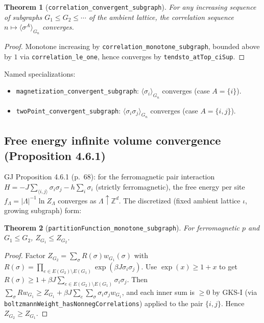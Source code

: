 \documentclass[a4paper,11pt]{article}
\newtheorem{theorem}{Theorem}
\begin{document}
\begin{theorem}[\texttt{correlation\_convergent\_subgraph}]
For any increasing sequence of subgraphs $G_1 \le G_2 \le \cdots$ of the ambient lattice,
the correlation sequence $n \mapsto \langle\sigma^A\rangle_{G_n}$ converges.
\end{theorem}

\begin{proof}
Monotone increasing by \texttt{correlation\_monotone\_subgraph},
bounded above by $1$ via \texttt{correlation\_le\_one}, hence converges by
\texttt{tendsto\_atTop\_ciSup}.
\end{proof}

Named specializations:
\begin{itemize}
  \item \texttt{magnetization\_convergent\_subgraph}: $\langle\sigma_i\rangle_{G_n}$
        converges (case $A = \{i\}$).
  \item \texttt{twoPoint\_convergent\_subgraph}: $\langle\sigma_i\sigma_j\rangle_{G_n}$
        converges (case $A = \{i,j\}$).
\end{itemize}

\subsection{Free energy infinite volume convergence (Proposition 4.6.1)}

GJ Proposition 4.6.1 (p.~68): for the ferromagnetic pair interaction
$H = -J\sum_{\langle i,j\rangle}\sigma_i\sigma_j - h\sum_i\sigma_i$
(strictly ferromagnetic), the free energy per site
$f_\Lambda = |\Lambda|^{-1}\ln Z_\Lambda$ converges as $\Lambda\uparrow\mathbb{Z}^d$.
The discretized (fixed ambient lattice $\iota$, growing subgraph) form:

\begin{theorem}[\texttt{partitionFunction\_monotone\_subgraph}]
For ferromagnetic $p$ and $G_1\le G_2$, $Z_{G_1}\le Z_{G_2}$.
\end{theorem}

\begin{proof}
Factor $Z_{G_2} = \sum_\sigma R(\sigma) w_{G_1}(\sigma)$ with
$R(\sigma)=\prod_{e\in E(G_2)\setminus E(G_1)}\exp(\beta J \sigma_i\sigma_j)$.
Use $\exp(x)\ge 1+x$ to get
$R(\sigma)\ge 1 + \beta J \sum_{e\in E(G_2)\setminus E(G_1)}\sigma_i\sigma_j$.
Then $\sum_\sigma R w_{G_1} \ge Z_{G_1} + \beta J \sum_e \sum_\sigma \sigma_i\sigma_j w_{G_1}$,
and each inner sum is $\ge 0$ by GKS-I (via \texttt{boltzmannWeight\_hasNonnegCorrelations})
applied to the pair $\{i,j\}$. Hence $Z_{G_2}\ge Z_{G_1}$.
\end{proof}
\end{document}
